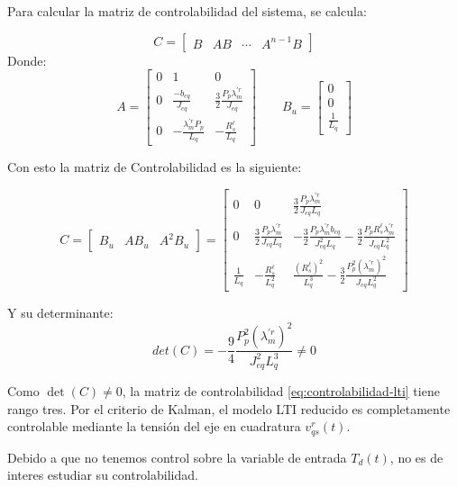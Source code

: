 \documentclass[blue,fullpaper]{ludusofficial}  %
\begin{document}
Para calcular la matriz de controlabilidad del sistema, se calcula:

\begin{equation}
\label{eq:controlabilidad-kalman}
    C = \begin{bmatrix} B & AB & \cdots & A^{n-1}B \end{bmatrix}
\end{equation}
Donde:
\[
A = \begin{bmatrix}
0 & 1 & 0 \\
0 & \frac{-b_{eq}}{J_{eq}} & \frac{3}{2}\frac{P_p\lambda_{m}^{'r}}{J_{eq}} \\
0 & -\frac{\lambda^{'r}_{m}P_p}{L_q} & -\frac{R^\ell_s}{L_q}
\end{bmatrix}
\qquad
B_u = \begin{bmatrix}
0 \\
 0\\
 \frac{1}{L_q}
\end{bmatrix}
\]

Con esto la matriz de Controlabilidad es la siguiente: 

\begin{equation}
\label{eq:controlabilidad-lti}
C = \begin{bmatrix} B_u & AB_u & A^2B_u \end{bmatrix} = \begin{bmatrix}
0 & 0 & \frac{3}{2}\frac{P_p \lambda_{m}^{'r}}{J_{eq} L_{q}} \\
0 & \frac{3}{2}\frac{P_p \lambda_{m}^{'r}}{J_{eq} L_{q}} & -\frac{3}{2}\frac{P_p \lambda_{m}^{'r} b_{eq}}{J_{eq}^2 L_{q}} - \frac{3}{2}\frac{P_p R^\ell_s \lambda_{m}^{'r}}{J_{eq} L_{q}^2} \\
\frac{1}{L_{q}} & -\frac{R^\ell_s}{L_{q}^2} & \frac{(R^\ell_s)^{2}}{L_{q}^3} - \frac{3}{2}\frac{P_p^{2} (\lambda_{m}^{'r})^{2}}{J_{eq} L_{q}^2}\end{bmatrix}
\end{equation}

Y su determinante: 
\[
det(C)=-\frac{9}{4} \frac{P_p^2 (\lambda_{m}^{'r})^2}{J_{eq}^2 L_q^3}\neq 0
\]

Como $\det(C)\neq 0$, la matriz de controlabilidad
\eqref{eq:controlabilidad-lti} tiene rango tres. Por el criterio
de Kalman, el modelo LTI reducido es completamente controlable
mediante la tensión del eje en cuadratura $v_{qs}^{r}(t)$.

Debido a que no tenemos control sobre la variable de entrada $T_d(t)$, no es de interes estudiar su controlabilidad.
\end{document}
